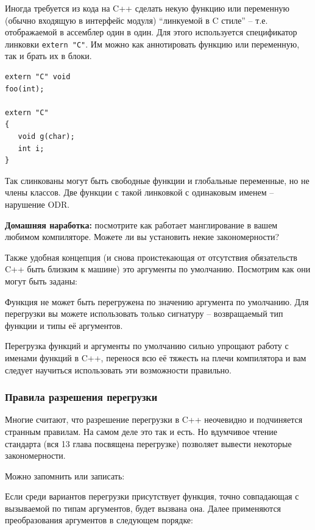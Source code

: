 \documentclass[a4paper,12pt,oneside]{article}
\begin{document}
Иногда требуется из кода на C++ сделать некую функцию или переменную (обычно входящую в интерфейс модуля) ``линкуемой в C стиле'' -- т.е. отображаемой в ассемблер один в один. Для этого используется спецификатор линковки \lstinline!extern "C"!. Им можно как аннотировать функцию или переменную, так и брать их в блоки.

\begin{lstlisting}
extern "C" void 
foo(int);

extern "C"
{
   void g(char);
   int i;
}
\end{lstlisting}

Так слинкованы могут быть свободные функции и глобальные переменные, но не члены классов. Две функции с такой линковкой с одинаковым именем -- нарушение ODR.

\textbf{Домашняя наработка:} посмотрите как работает манглирование в вашем любимом компиляторе. Можете ли вы установить некие закономерности?

Также удобная концепция (и снова проистекающая от отсутствия обязательств C++ быть близким к машине) это аргументы по умолчанию. Посмотрим как они могут быть заданы:



Функция не может быть перегружена по значению аргумента по умолчанию. Для перегрузки вы можете использовать только сигнатуру – возвращаемый тип функции и типы её аргументов.

Перегрузка функций и аргументы по умолчанию сильно упрощают работу с именами функций в C++, перенося всю её тяжесть на плечи компилятора и вам следует научиться использовать эти возможности правильно.

\subsubsection{Правила разрешения перегрузки}\label{Overloading}

Многие считают, что разрешение перегрузки в C++ неочевидно и подчиняется странным правилам. На самом деле это так и есть. Но вдумчивое чтение стандарта (вся 13 глава посвящена перегрузке) позволяет вывести некоторые закономерности. 

Можно запомнить или записать:

Если среди вариантов перегрузки присутствует функция, точно совпадающая с вызываемой по типам аргументов, будет вызвана она. Далее применяются преобразования аргументов в следующем порядке:
\end{document}
